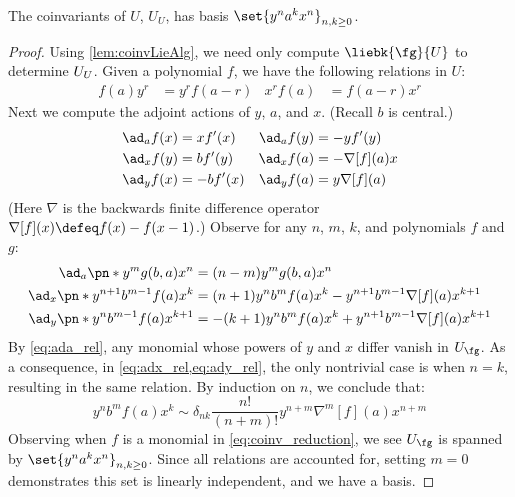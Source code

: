 \documentclass{article}
\begin{document}
\begin{theorem}
        The coinvariants of $U$, $U_U$, has basis
        $\set{y^n a^k x^n}_{n, k\ge 0}$.
\end{theorem}
\begin{proof}
Using \cref{lem:coinvLieAlg}, we need only compute $\liebk{\Alg}{\CU}$ to
determine $U_U$. Given a polynomial $f$, we have the
following relations in $U$:
\begin{align}
        f(a)y^r &= y^rf(a-r) &
        x^rf(a) &= f(a-r)x^r
\end{align}
Next we compute the adjoint actions of $y$, $a$, and $x$. (Recall $b$ is
central.)
\begin{align}
  \ad_a f(x) &= xf'(x)&
  \ad_a f(y) &= -yf'(y)\label{eq:ada}\\
  \ad_x f(y) &= bf'(y) &
  \ad_x f(a) &= -\nabla[f](a)x\label{eq:adx}\\
  \ad_y f(x) &= -bf'(x) &
  \ad_y f(a) &= y\nabla[f](a)\label{eq:ady}
\end{align}
(Here $\nabla$ is the backwards finite difference operator $\nabla[f](x) \defeq
f(x) - f(x-1)$.) Observe for any $n$, $m$, $k$, and polynomials $f$ and $g$:
\begin{align}
        \ad_a \pn*{y^m g(b, a) x^n } &= (n-m)y^mg(b, a) x^n
        \label{eq:ada_rel}\\
        \ad_{x}\pn*{y^{n+1}b^{m-1}f(a)x^{k}} &=
                (n+1)y^{n}b^{m}f(a)x^{k} - y^{n+1}b^{m-1}\nabla[f](a)x^{k+1}
        \label{eq:adx_rel}\\
        \ad_{y}\pn*{y^n b^{m-1} f(a) x^{k+1}} &=
                - (k+1)y^n b^m f(a) x^k + y^{n+1} b^{m-1} \nabla[f](a)x^{k+1}
        \label{eq:ady_rel}
\end{align}
By \cref{eq:ada_rel}, any monomial whose powers of $y$ and $x$ differ vanish in
$\CU_{\Alg}$. As a consequence, in \cref{eq:adx_rel,eq:ady_rel}, the only
nontrivial case is when $n=k$, resulting in the same relation. By induction on
$n$, we conclude that:
\begin{equation}\label{eq:coinv_reduction}
        y^n b^m f(a) x^k \sim δ_{nk}\frac{n!}{(n+m)!}y^{n+m}\nabla^m[f](a)x^{n+m}
\end{equation}
Observing when $f$ is a monomial in \cref{eq:coinv_reduction}, we see
$\CU_{\Alg}$ is spanned by $\set{y^n a^k x^n}_{n, k \ge 0}$. Since all relations are
accounted for, setting $m=0$  demonstrates this set is linearly independent, and
we have a basis.
\end{proof}
\end{document}

